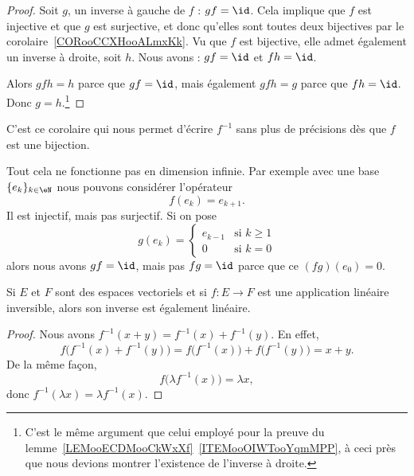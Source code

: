 \begin{proof}
    Soit \( g\), un inverse à gauche de \( f\) : \( gf=\id\). Cela implique que \( f\) est injective et que \( g\) est surjective, et donc qu'elles sont toutes deux bijectives par le corolaire~\ref{CORooCCXHooALmxKk}. Vu que \( f\) est bijective, elle admet également un inverse à droite, soit \( h\). Nous avons : \( gf=\id\) et \( fh=\id\).

    Alors \( gfh=h\) parce que \( gf=\id\), mais également \( gfh=g\) parce que \( fh=\id\). Donc \( g=h\).\footnote{C'est le même argument que celui employé pour la preuve du lemme~\ref{LEMooECDMooCkWxXf}~\ref{ITEMooOIWTooYqmMPP}, à ceci près que nous devions montrer l'existence de l'inverse à droite.}
\end{proof}
C'est ce corolaire qui nous permet d'écrire \( f^{-1}\) sans plus de précisions dès que \( f\) est une bijection.

\begin{example}
    Tout cela ne fonctionne pas en dimension infinie. Par exemple avec une base \( \{ e_k \}_{k\in \eN}\) nous pouvons considérer l'opérateur
    \begin{equation}
        f(e_k)=e_{k+1}.
    \end{equation}
    Il est injectif, mais pas surjectif. Si on pose
    \begin{equation}
        g(e_k)=\begin{cases}
            e_{k-1}    &   \text{si } k\geq 1\\
            0    &    \text{si } k=0
        \end{cases}
    \end{equation}
    alors nous avons \( gf=\id\), mais pas \( fg=\id\) parce que ce \( (fg)(e_0)=0\).
\end{example}

\begin{lemma}       \label{LEMooRZDTooEuLTrO}
    Si \( E\) et \( F\) sont des espaces vectoriels et si \( f\colon E\to F\) est une application linéaire inversible, alors son inverse est également linéaire.
\end{lemma}

\begin{proof}
    Nous avons \( f^{-1}(x+y)=f^{-1}(x)+f^{-1}(y)\). En effet,
    \begin{equation}
        f\big( f^{-1}(x)+f^{-1}(y) \big)=f\big( f^{-1}(x) \big)+f\big( f^{-1}(y) \big)=x+y.
    \end{equation}
    De la même façon,
    \begin{equation}
        f\big( \lambda f^{-1}(x) \big)=\lambda x, 
    \end{equation}
    donc \( f^{-1}(\lambda x)=\lambda f^{-1}(x)\).
\end{proof}

